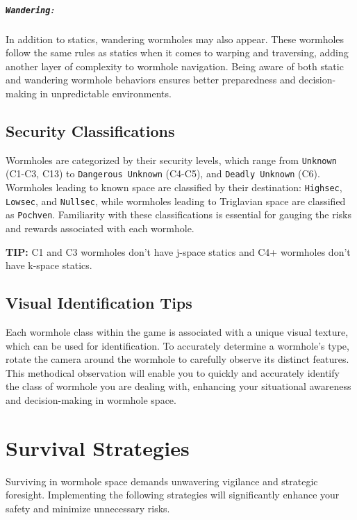 \documentclass[a4paper,12pt]{report}
\begin{document}
\paragraph{\texttt{Wandering}:} In addition to statics, wandering wormholes may also appear. These wormholes follow the same rules as statics when it comes to warping and traversing, adding another layer of complexity to wormhole navigation. Being aware of both static and wandering wormhole behaviors ensures better preparedness and decision-making in unpredictable environments.

\section{Security Classifications}

Wormholes are categorized by their security levels, which range from \texttt{Unknown} (C1-C3, C13) to \texttt{Dangerous Unknown} (C4-C5), and \texttt{Deadly Unknown} (C6). Wormholes leading to known space are classified by their destination: \texttt{Highsec}, \texttt{Lowsec}, and \texttt{Nullsec}, while wormholes leading to Triglavian space are classified as \texttt{Pochven}. Familiarity with these classifications is essential for gauging the risks and rewards associated with each wormhole.

\textsf{\textbf{TIP:}} \textsf{C1 and C3 wormholes don't have j-space statics and C4+ wormholes don't have k-space statics.}

\section{Visual Identification Tips}

Each wormhole class within the game is associated with a unique visual texture, which can be used for identification. To accurately determine a wormhole’s type, rotate the camera around the wormhole to carefully observe its distinct features. This methodical observation will enable you to quickly and accurately identify the class of wormhole you are dealing with, enhancing your situational awareness and decision-making in wormhole space.

\chapter{Survival Strategies}

Surviving in wormhole space demands unwavering vigilance and strategic foresight. Implementing the following strategies will significantly enhance your safety and minimize unnecessary risks.
\end{document}
